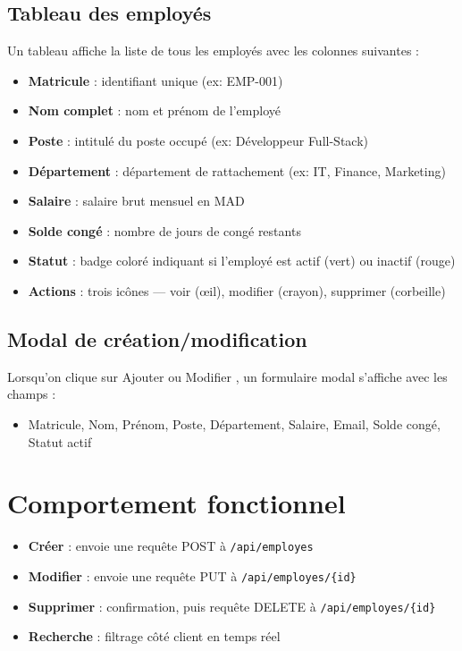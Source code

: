 \documentclass[12pt,a4paper]{report}
\begin{document}
\subsection{Tableau des employés}

Un tableau affiche la liste de tous les employés avec les colonnes suivantes :
\begin{itemize}
    \item \textbf{Matricule} : identifiant unique (ex: EMP-001)
    \item \textbf{Nom complet} : nom et prénom de l'employé
    \item \textbf{Poste} : intitulé du poste occupé (ex: Développeur Full-Stack)
    \item \textbf{Département} : département de rattachement (ex: IT, Finance, Marketing)
    \item \textbf{Salaire} : salaire brut mensuel en MAD
    \item \textbf{Solde congé} : nombre de jours de congé restants
    \item \textbf{Statut} : badge coloré indiquant si l'employé est actif (vert) ou inactif (rouge)
    \item \textbf{Actions} : trois icônes — voir (œil), modifier (crayon), supprimer (corbeille)
\end{itemize}

\subsection{Modal de création/modification}

Lorsqu'on clique sur \og Ajouter \fg{} ou \og Modifier \fg{}, un formulaire modal s'affiche avec les champs :
\begin{itemize}
    \item Matricule, Nom, Prénom, Poste, Département, Salaire, Email, Solde congé, Statut actif
\end{itemize}

\section{Comportement fonctionnel}

\begin{itemize}
    \item \textbf{Créer} : envoie une requête POST à \texttt{/api/employes}
    \item \textbf{Modifier} : envoie une requête PUT à \texttt{/api/employes/\{id\}}
    \item \textbf{Supprimer} : confirmation, puis requête DELETE à \texttt{/api/employes/\{id\}}
    \item \textbf{Recherche} : filtrage côté client en temps réel
\end{itemize}
\end{document}
